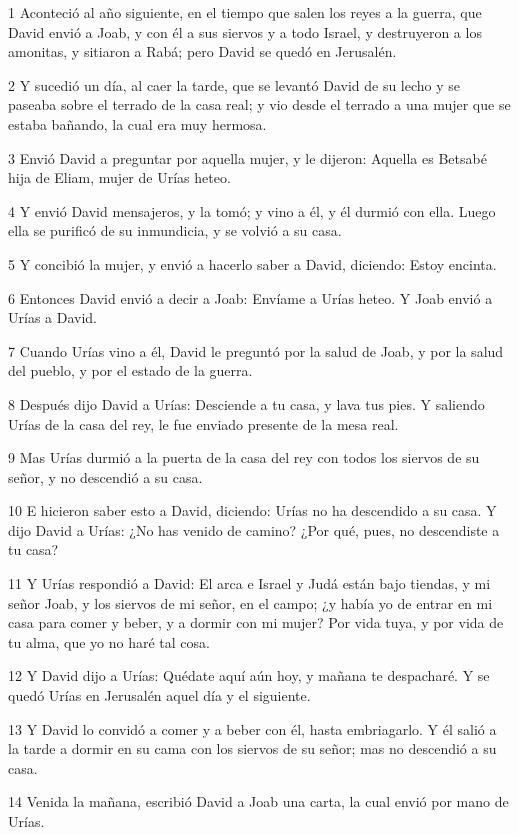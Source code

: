 \par 1 Aconteció al año siguiente, en el tiempo que salen los reyes a la guerra, que David envió a Joab, y con él a sus siervos y a todo Israel, y destruyeron a los amonitas, y sitiaron a Rabá; pero David se quedó en Jerusalén. 
\par 2 Y sucedió un día, al caer la tarde, que se levantó David de su lecho y se paseaba sobre el terrado de la casa real; y vio desde el terrado a una mujer que se estaba bañando, la cual era muy hermosa.
\par 3 Envió David a preguntar por aquella mujer, y le dijeron: Aquella es Betsabé hija de Eliam, mujer de Urías heteo.
\par 4 Y envió David mensajeros, y la tomó; y vino a él, y él durmió con ella. Luego ella se purificó de su inmundicia, y se volvió a su casa.
\par 5 Y concibió la mujer, y envió a hacerlo saber a David, diciendo: Estoy encinta.
\par 6 Entonces David envió a decir a Joab: Envíame a Urías heteo. Y Joab envió a Urías a David.
\par 7 Cuando Urías vino a él, David le preguntó por la salud de Joab, y por la salud del pueblo, y por el estado de la guerra.
\par 8 Después dijo David a Urías: Desciende a tu casa, y lava tus pies. Y saliendo Urías de la casa del rey, le fue enviado presente de la mesa real.
\par 9 Mas Urías durmió a la puerta de la casa del rey con todos los siervos de su señor, y no descendió a su casa.
\par 10 E hicieron saber esto a David, diciendo: Urías no ha descendido a su casa. Y dijo David a Urías: ¿No has venido de camino? ¿Por qué, pues, no descendiste a tu casa?
\par 11 Y Urías respondió a David: El arca e Israel y Judá están bajo tiendas, y mi señor Joab, y los siervos de mi señor, en el campo; ¿y había yo de entrar en mi casa para comer y beber, y a dormir con mi mujer? Por vida tuya, y por vida de tu alma, que yo no haré tal cosa.
\par 12 Y David dijo a Urías: Quédate aquí aún hoy, y mañana te despacharé. Y se quedó Urías en Jerusalén aquel día y el siguiente.
\par 13 Y David lo convidó a comer y a beber con él, hasta embriagarlo. Y él salió a la tarde a dormir en su cama con los siervos de su señor; mas no descendió a su casa.
\par 14 Venida la mañana, escribió David a Joab una carta, la cual envió por mano de Urías.
